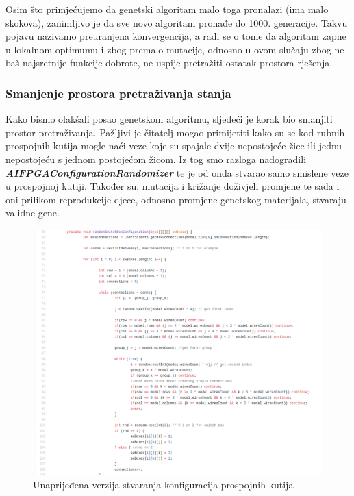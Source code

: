 \documentclass[times, utf8, zavrsni]{fer}
\begin{document}
Osim što primjećujemo da genetski algoritam malo toga pronalazi (ima malo skokova), zanimljivo je da sve novo algoritam pronađe do 1000. generacije. Takvu pojavu nazivamo preuranjena konvergencija, a radi se o tome da algoritam zapne u lokalnom optimumu i zbog premalo mutacije, odnosno u ovom slučaju zbog ne baš najsretnije funkcije dobrote, ne uspije pretražiti ostatak prostora rješenja. 

\subsubsection{Smanjenje prostora pretraživanja stanja}

Kako bismo olakšali posao genetskom algoritmu, sljedeći je korak bio smanjiti prostor pretraživanja. Pažljivi je čitatelj mogao primijetiti kako su se kod rubnih prospojnih kutija mogle naći veze koje su spajale dvije nepostojeće žice ili jednu nepostojeću s jednom postojećom žicom. Iz tog smo razloga nadogradili \textbf{\emph{AIFPGAConfigurationRandomizer}} te je od onda stvarao samo smislene veze u prospojnoj kutiji. Također su, mutacija i križanje doživjeli promjene te sada i oni prilikom reprodukcije djece, odnosno promjene genetskog materijala, stvaraju validne gene. 


\begin{figure}[!htb]
	\centering
	\includegraphics[width=18cm]{slike/noviRandomizer.png}
	\caption{Unaprijeđena verzija stvaranja konfiguracija prospojnih kutija}
	\label{fig:novi-random}
\end{figure} 
\end{document}
